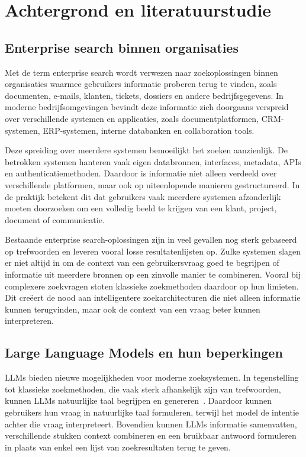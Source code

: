 \chapter{Achtergrond en literatuurstudie}
\label{chap:achtergrond}

\section{Enterprise search binnen organisaties}
\label{sec:enterprise-search}

Met de term enterprise search wordt verwezen naar zoekoplossingen binnen organisaties waarmee gebruikers informatie proberen terug te vinden, zoals documenten, e-mails, klanten, tickets, dossiers en andere bedrijfsgegevens. In moderne bedrijfsomgevingen bevindt deze informatie zich doorgaans verspreid over verschillende systemen en applicaties, zoals documentplatformen, \gls{CRM}-systemen, \gls{ERP}-systemen, interne databanken en collaboration tools.

Deze spreiding over meerdere systemen bemoeilijkt het zoeken aanzienlijk. De betrokken systemen hanteren vaak eigen databronnen, interfaces, metadata, \glspl{API} en authenticatiemethoden. Daardoor is informatie niet alleen verdeeld over verschillende platformen, maar ook op uiteenlopende manieren gestructureerd. In de praktijk betekent dit dat gebruikers vaak meerdere systemen afzonderlijk moeten doorzoeken om een volledig beeld te krijgen van een klant, project, document of communicatie.


Bestaande enterprise search-oplossingen zijn in veel gevallen nog sterk gebaseerd op trefwoorden en leveren vooral losse resultatenlijsten op. Zulke systemen slagen er niet altijd in om de context van een gebruikersvraag goed te begrijpen of informatie uit meerdere bronnen op een zinvolle manier te combineren. Vooral bij complexere zoekvragen stoten klassieke zoekmethoden daardoor op hun limieten. Dit creëert de nood aan intelligentere zoekarchitecturen die niet alleen informatie kunnen terugvinden, maar ook de context van een vraag beter kunnen interpreteren.


\section{Large Language Models en hun beperkingen}
\label{sec:llm}

\glspl{LLM} bieden nieuwe mogelijkheden voor moderne zoeksystemen. In tegenstelling tot klassieke zoekmethoden, die vaak sterk afhankelijk zijn van trefwoorden, kunnen \glspl{LLM} natuurlijke taal begrijpen en genereren~\cite{brown2020gpt3}. Daardoor kunnen gebruikers hun vraag in natuurlijke taal formuleren, terwijl het model de intentie achter die vraag interpreteert. Bovendien kunnen \glspl{LLM} informatie samenvatten, verschillende stukken context combineren en een bruikbaar antwoord formuleren in plaats van enkel een lijst van zoekresultaten terug te geven.

